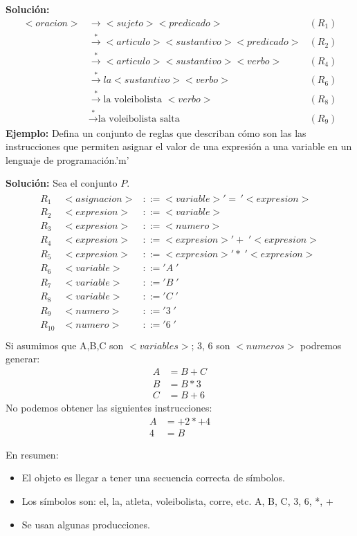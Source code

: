 \textbf{Solución: }
\begin{align*}
<oracion>&\rightarrow<sujeto><predicado>	& (R_1)	\\
		 &\xrightarrow{*}<articulo><sustantivo><predicado>	& (R_2)	\\
		 &\xrightarrow{*}<articulo><sustantivo><verbo>	& (R_4)	\\
		 &\xrightarrow{*}la <sustantivo><verbo>			& (R_6)	\\
		 &\xrightarrow{*}\mbox{la voleibolista }<verbo>	& (R_8)	\\
		 &\xrightarrow{*}\mbox{la voleibolista salta}	& (R_9)	
\end{align*}
\textbf{Ejemplo: }Defina un conjunto de reglas que describan cómo son las  las instrucciones que permiten asignar el valor de una expresión a una variable en un lenguaje de programación.'m'

\textbf{Solución: }Sea el conjunto $P$.
\begin{align*}
\begin{array}{lrl}
R_1	&	<asignacion>&::=<variable>'=\,'<expresion>	\\
R_2	&	<expresion>&::=<variable>	\\
R_3	&	<expresion>&::=<numero>		\\
R_4	&	<expresion>&::=<expresion>'+\;'<expresion>	\\
R_5	& 	<expresion>&::=<expresion>'*\;'<expresion>	\\
R_6	&	<variable>&::='A\;'\\
R_7	&	<variable>&::='B\;'	\\
R_8	&	<variable>&::='C\;'	\\
R_9	&	<numero>&::='3\;'		\\
R_{10}&	<numero>&::='6\; '		\\
\end{array}
\end{align*}
Si asumimos que A,B,C son $<variables>$; 3, 6 son $<numeros>$ podremos generar:
\begin{align*}
A&=B+C	\\
B&=B*3	\\
C&=B+6
\end{align*}
No podemos obtener las siguientes instrucciones:
\begin{align*}
A&=+2*+4	\\
4&=B
\end{align*}

En resumen:
\begin{itemize}
\item El objeto es llegar a tener una secuencia correcta de símbolos.
\item Los símbolos son: el, la, atleta, voleibolista, corre, etc. A, B, C, 3, 6, *, +
\item Se usan algunas producciones.
\end{itemize}


